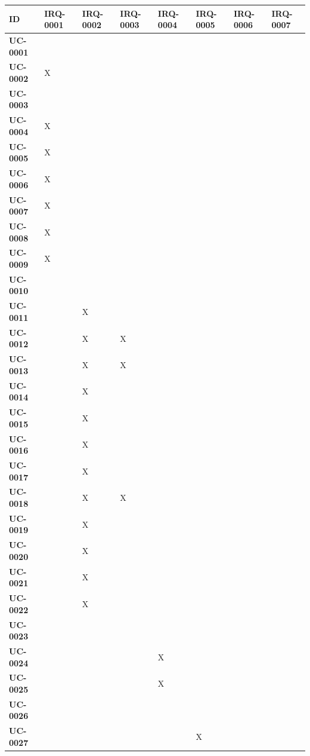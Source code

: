 \begin{table}[H]
\centering
\small
\begin{tabular}{|p{2.2cm}|p{1.9cm}|p{1.9cm}|p{1.9cm}|p{1.9cm}|p{1.9cm}|p{1.9cm}|p{1.9cm}|}
\hline
\textbf{ID} & \textbf{IRQ-0001} & \textbf{IRQ-0002} & \textbf{IRQ-0003} & \textbf{IRQ-0004} & \textbf{IRQ-0005} & \textbf{IRQ-0006} & \textbf{IRQ-0007} \\
\hline
\hline
\textbf{UC-0001} & & & & & & & \\
\hline
\textbf{UC-0002} & X & & & & & & \\
\hline
\textbf{UC-0003} & & & & & & & \\
\hline
\textbf{UC-0004} & X & & & & & & \\
\hline
\textbf{UC-0005} & X & & & & & & \\
\hline
\textbf{UC-0006} & X & & & & & & \\
\hline
\textbf{UC-0007} & X & & & & & & \\
\hline
\textbf{UC-0008} & X & & & & & & \\
\hline
\textbf{UC-0009} & X & & & & & & \\
\hline
\textbf{UC-0010} & & & & & & & \\
\hline
\textbf{UC-0011} & & X & & & & & \\
\hline
\textbf{UC-0012} & & X & X & & & & \\
\hline
\textbf{UC-0013} & & X & X & & & & \\
\hline
\textbf{UC-0014} & & X & & & & & \\
\hline
\textbf{UC-0015} & & X & & & & & \\
\hline
\textbf{UC-0016} & & X & & & & & \\
\hline
\textbf{UC-0017} & & X & & & & & \\
\hline
\textbf{UC-0018} & & X & X & & & & \\
\hline
\textbf{UC-0019} & & X & & & & & \\
\hline
\textbf{UC-0020} & & X & & & & & \\
\hline
\textbf{UC-0021} & & X & & & & & \\
\hline
\textbf{UC-0022} & & X & & & & & \\
\hline
\textbf{UC-0023} & & & & & & & \\
\hline
\textbf{UC-0024} & & & & X & & & \\
\hline
\textbf{UC-0025} & & & & X & & & \\
\hline
\textbf{UC-0026} & & & & & & & \\
\hline
\textbf{UC-0027} & & & & & X & & \\

\end{tabular}
\end{table}
